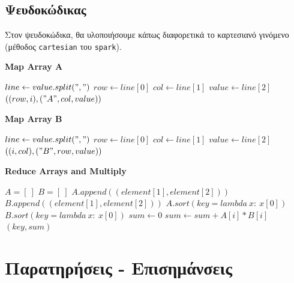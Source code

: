 \documentclass{ntua}
\begin{document}
\subsection{Ψευδοκώδικας}

Στον ψευδοκώδικα, θα υλοποιήσουμε κάπως διαφορετικά το καρτεσιανό γινόμενο (μέθοδος \texttt{cartesian} του \texttt{spark}).

\begin{algorithm}[H]
\caption*{\bfseries{Map Array A}}
\begin{algorithmic}[1]
	\State $line \gets value.split(",")$
	\State $row \gets line[0]$
	\State $col \gets line[1]$
	\State $value \gets line[2]$
		\Emit $((row, i), ("A", col, value))$
	\EndFor
	\EndFunction
\end{algorithmic}
\end{algorithm}

\begin{algorithm}[H]
\caption*{\bfseries{Map Array B}}
\begin{algorithmic}[1]
	\State $line \gets value.split(",")$
	\State $row \gets line[0]$
	\State $col \gets line[1]$
	\State $value \gets line[2]$
	\Emit $((i, col), ("B", row, value))$
	\EndFor
	\EndFunction
\end{algorithmic}
\end{algorithm}

\begin{algorithm}[H]
\caption*{\bfseries{Reduce Arrays and Multiply}}
\begin{algorithmic}[1]
	\State $A = [\ ]$
	\State $B = [\ ]$
			\State $A.append((element[1], element[2]))$
		\Else
			\State $B.append((element[1], element[2]))$
		\EndIf
	\EndFor
	\State $A.sort(key=lambda\ x:\ x[0])$
	\State $B.sort(key=lambda\ x:\ x[0])$
	\State $sum \gets 0$
		\State $sum \gets sum + A[i] * B[i]$
	\EndFor
	\Emit $(key, sum)$
	\EndFunction
\end{algorithmic}
\end{algorithm}

\newpage

\section{Παρατηρήσεις - Επισημάνσεις}
\end{document}
